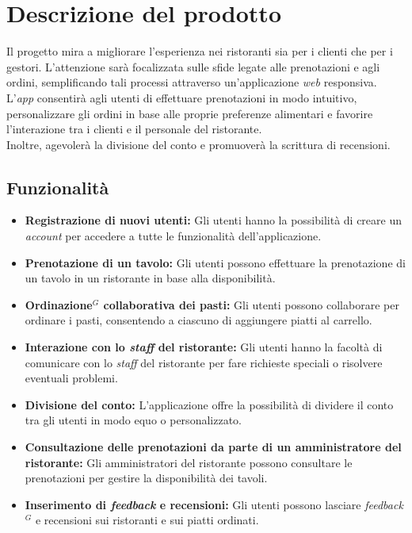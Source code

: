 \section{Descrizione del prodotto}
Il progetto mira a migliorare l'esperienza nei ristoranti sia per i clienti che per i gestori.
L'attenzione sarà focalizzata sulle sfide legate alle prenotazioni e agli ordini, semplificando tali
processi attraverso un'applicazione \textit{web} responsiva.
L'\textit{app} consentirà agli utenti di effettuare prenotazioni in modo intuitivo, personalizzare
gli ordini in base alle proprie preferenze alimentari e favorire l'interazione tra i clienti e
il personale del ristorante. \\
Inoltre, agevolerà la divisione del conto e promuoverà la scrittura di recensioni.


\subsection{Funzionalità}

\begin{itemize}
	\item \textbf{Registrazione di nuovi utenti:} Gli utenti hanno la possibilità di creare un \textit{account} per accedere a tutte le funzionalità dell'applicazione.
	\item \textbf{Prenotazione di un tavolo:} Gli utenti possono effettuare la prenotazione di un tavolo in un ristorante in base alla disponibilità.
	\item \textbf{Ordinazione$^G$ collaborativa dei pasti:} Gli utenti possono collaborare per ordinare i pasti, consentendo a ciascuno di aggiungere piatti al carrello.
	\item \textbf{Interazione con lo \textit{staff} del ristorante:} Gli utenti hanno la facoltà di comunicare con lo \textit{staff} del ristorante per fare richieste speciali o risolvere eventuali problemi.
	\item \textbf{Divisione del conto:} L'applicazione offre la possibilità di dividere il conto tra gli utenti in modo equo o personalizzato.
	\item \textbf{Consultazione delle prenotazioni da parte di un amministratore del ristorante:} Gli amministratori del ristorante possono consultare le prenotazioni per gestire la disponibilità dei tavoli.
	\item \textbf{Inserimento di \textit{feedback} e recensioni:} Gli utenti possono lasciare \textit{feedback$^G$} e recensioni sui ristoranti e sui piatti ordinati.
\end{itemize}
